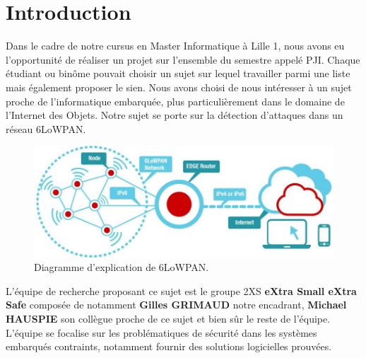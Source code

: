 \chapter*{Introduction}
\label{chap:introduction}

Dans le cadre de notre cursus en Master Informatique à Lille 1, nous avons eu l’opportunité de réaliser un projet sur l’ensemble du semestre appelé PJI. Chaque étudiant ou binôme pouvait choisir un sujet sur lequel travailler parmi une liste mais également proposer le sien.
Nous avons choisi de nous intéresser à un sujet proche de l'informatique embarquée, plus particulièrement dans le domaine de l'Internet des Objets. Notre sujet se porte sur la détection d'attaques dans un réseau 6LoWPAN.

\begin{figure}[htp]
	\centering
	\includegraphics[width=16cm]{images/6lowpan.jpg}
	\caption{Diagramme d'explication de 6LoWPAN.}
	\label{fig:diagramme-6lowpan}
\end{figure}
L'équipe de recherche proposant ce sujet est le groupe 2XS \textbf{eXtra Small eXtra Safe} composée de notamment \textbf{Gilles GRIMAUD} notre encadrant, \textbf{Michael HAUSPIE} son collègue proche de ce sujet et bien sûr le reste de l'équipe.
L'équipe se focalise sur les problématiques de sécurité dans les systèmes embarqués contraints, notamment fournir des solutions logicielles prouvées.

